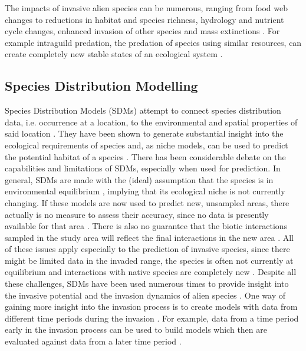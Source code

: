 \documentclass[12pt,a4paper]{article}
\begin{document}
The impacts of invasive alien species can be numerous, ranging from food web changes to reductions in habitat and species richness, hydrology and nutrient cycle changes, enhanced invasion of other species and mass extinctions \autocite{simberloff2013invasiveimpacts}.
For example intraguild predation, the predation of species using similar resources, can create completely new stable states of an ecological system \autocite{polis1989theoryIGP}.

\subsection{Species Distribution Modelling}
Species Distribution Models (SDMs) attempt to connect species distribution data, i.e. occurrence at a location, to the environmental and spatial properties of said location \autocite{elith2009sdmtheory}.
They have been shown to generate substantial insight into the ecological requirements of species and, as niche models, can be used to predict the potential habitat of a species \autocite{araujo2006sdmchallenges}.
There has been considerable debate on the capabilities and limitations of SDMs, especially when used for prediction.
In general, SDMs are made with the (ideal) assumption that the species is in environmental equilibrium \autocite{elith2009sdmtheory}, implying that its ecological niche is not currently changing.
If these models are now used to predict new, unsampled areas, there actually is no measure to assess their accuracy, since no data is presently available for that area \autocite{araujo2006sdmchallenges}.
There is also no guarantee that the biotic interactions sampled in the study area will reflect the final interactions in the new area \autocite{elith2009sdmtheory}.
All of these issues apply especially to the prediction of invasive species, since there might be limited data in the invaded range, the species is often not currently at equilibrium and interactions with native species are completely new \autocite{mainali2015sdmprojecting}.
Despite all these challenges, SDMs have been used numerous times to provide insight into the invasive potential and the invasion dynamics of alien species \autocite{zimmermann2010sdmtrends}.
One way of gaining more insight into the invasion process is to create models with data from different time periods during the invasion \autocite{briscoe2019palmerisdm}.
For example, data from a time period early in the invasion process can be used to build models which then are evaluated against data from a later time period \autocite{barbet2018nigrithoraxsdm}.
\end{document}
